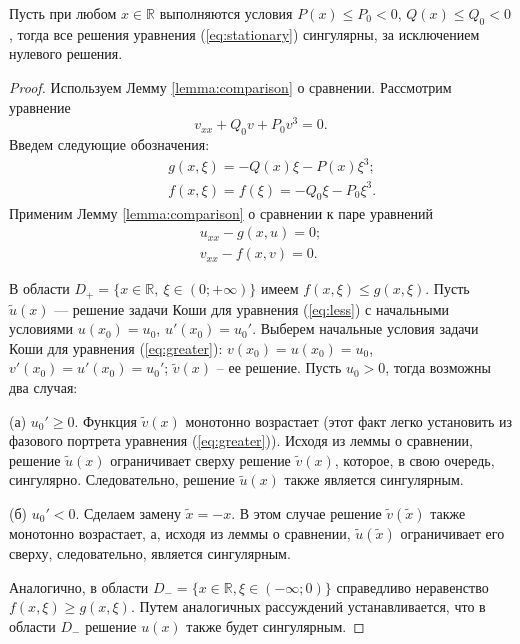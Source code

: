 \begin{proposition}
Пусть при любом $x \in \mathbb{R}$ выполняются условия $P(x) \le P_0 < 0$, $Q(x) \le Q_0 < 0$, тогда  все решения уравнения (\ref{eq:stationary}) сингулярны, за исключением нулевого решения.
\label{prop:singular}
\end{proposition}
%
\begin{proof}
Используем Лемму \ref{lemma:comparison} о сравнении.
Рассмотрим уравнение
%
\begin{equation}
v_{xx} + Q_0 v + P_0 v^3 = 0.
\end{equation}
%
Введем следующие обозначения:
%
\begin{eqnarray}
&& g(x, \xi) = -Q(x)\xi - P(x)\xi^3;\\
&& f(x, \xi) = f(\xi) = -Q_0 \xi - P_0 \xi^3.
\end{eqnarray}
%
Применим Лемму \ref{lemma:comparison} о сравнении к паре уравнений
%
\begin{eqnarray}
u_{xx} - g(x, u) = 0; \label{eq:less} \\
v_{xx} - f(x, v) = 0. \label{eq:greater}
\end{eqnarray}
%

В области $D_+ = \{ x \in \mathbb{R},~\xi \in (0; +\infty) \}$ имеем $f(x, \xi) \le g(x, \xi)$. Пусть $\tilde{u}(x)$ --- решение задачи Коши для уравнения (\ref{eq:less}) с начальными условиями $u(x_0) = u_0$, $u'(x_0) = u_0'$.
Выберем начальные условия задачи Коши для уравнения (\ref{eq:greater}): $v(x_0) = u(x_0) = u_0$, $v'(x_0) = u'(x_0) = u_0'$; $\tilde{v}(x)$ -- ее решение.
Пусть $u_0 > 0$, тогда возможны два случая:

(а) $u_0' \ge 0$.
Функция $\tilde{v}(x)$  монотонно возрастает (этот факт легко установить из фазового портрета уравнения (\ref{eq:greater})).
Исходя из леммы о сравнении, решение $\tilde{u}(x)$ ограничивает сверху решение $\tilde{v}(x)$, которое, в свою очередь, сингулярно.
Следовательно, решение $\tilde{u}(x)$ также является сингулярным.

(б) $u_0' < 0$.
Сделаем замену $\tilde{x} = -x$.
В этом случае решение $\tilde{v}(\tilde{x})$  также монотонно возрастает, а, исходя из леммы
о сравнении, $\tilde{u}(\tilde{x})$ ограничивает его сверху, следовательно, является сингулярным.

Аналогично, в области $D_- = \{x \in \mathbb{R}, \xi \in (-\infty; 0)\}$ справедливо неравенство $f(x,\xi) \ge g(x,\xi)$.
Путем аналогичных рассуждений устанавливается, что в области $D_-$ решение $u(x)$ также будет сингулярным.
\end{proof}

